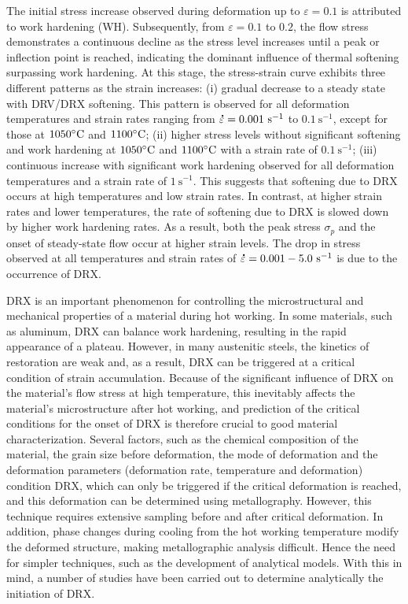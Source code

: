 \documentclass[metals,article,submit,pdftex,moreauthors]{Definitions/mdpi}
\DeclareRobustCommand{\mdot}[1]{\accentset{\mbox{\bfseries .}}{#1}}
\DeclareRobustCommand{\ps}{\text{s}^{-1}}
\begin{document}
The initial stress increase observed during deformation up to $\varepsilon=0.1$ is attributed to work hardening (WH).
Subsequently, from $\varepsilon=0.1$ to $0.2$, the flow stress demonstrates a continuous decline as the stress level increases until a peak or inflection point is reached, indicating the dominant influence of thermal softening surpassing work hardening.
At this stage, the stress-strain curve exhibits three different patterns as the strain increases: (i) gradual decrease to a steady state with DRV/DRX softening.
This pattern is observed for all deformation temperatures and strain rates ranging from $\mdot\varepsilon=0.001~\ps$ to $0.1~\ps$, except for those at $1050\celsius$ and $1100\celsius$; (ii) higher stress levels without significant softening and work hardening at $1050\celsius$ and $1100\celsius$ with a strain rate of $0.1~\ps$; (iii) continuous increase with significant work hardening observed for all deformation temperatures and a strain rate of $1~\ps$.
This suggests that softening due to DRX occurs at high temperatures and low strain rates.
In contrast, at higher strain rates and lower temperatures, the rate of softening due to DRX is slowed down by higher work hardening rates.
As a result, both the peak stress $\sigma_p$ and the onset of steady-state flow occur at higher strain levels.
The drop in stress observed at all temperatures and strain rates of $\mdot\varepsilon=0.001-5.0~\ps$ is due to the occurrence of DRX.

DRX is an important phenomenon for controlling the microstructural and mechanical properties of a material during hot working.
In some materials, such as aluminum, DRX can balance work hardening, resulting in the rapid appearance of a plateau.
However, in many austenitic steels, the kinetics of restoration are weak and, as a result, DRX can be triggered at a critical condition of strain accumulation.
Because of the significant influence of DRX on the material's flow stress at high temperature, this inevitably affects the material's microstructure after hot working, and prediction of the critical conditions for the onset of DRX is therefore crucial to good material characterization.
Several factors, such as the chemical composition of the material, the grain size before deformation, the mode of deformation and the deformation parameters (deformation rate, temperature and deformation) condition DRX, which can only be triggered if the critical deformation is reached, and this deformation can be determined using metallography.
However, this technique requires extensive sampling before and after critical deformation.
In addition, phase changes during cooling from the hot working temperature modify the deformed structure, making metallographic analysis difficult.
Hence the need for simpler techniques, such as the development of analytical models.
With this in mind, a number of studies have been carried out to determine analytically the initiation of DRX.
\end{document}
